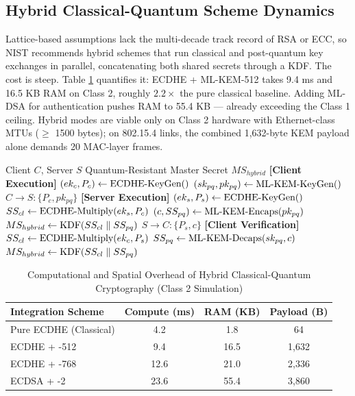 \subsection{Hybrid Classical-Quantum Scheme Dynamics}

Lattice-based assumptions lack the multi-decade track record of RSA or ECC, so NIST recommends hybrid schemes that run classical and post-quantum key exchanges in parallel, concatenating both shared secrets through a KDF. The cost is steep. Table \ref{tab:hybrid_overhead} quantifies it: ECDHE + ML-KEM-512 takes 9.4 ms and 16.5 KB RAM on Class 2, roughly $2.2\times$ the pure classical baseline. Adding ML-DSA for authentication pushes RAM to 55.4 KB — already exceeding the Class 1 ceiling. Hybrid modes are viable only on Class 2 hardware with Ethernet-class MTUs ($\geq$ 1500 bytes); on 802.15.4 links, the combined 1,632-byte KEM payload alone demands 20 MAC-layer frames.

\begin{algorithm}[htbp]
\caption{Standardized Hybrid ECDHE + ML-KEM Exchange}
\label{alg:hybrid}
\begin{algorithmic}[1]
\Require Client $C$, Server $S$
\Ensure Quantum-Resistant Master Secret $MS_{hybrid}$
\State \textbf{[Client Execution]}
\State $(ek_c, P_c) \gets \text{ECDHE-KeyGen}()$
\State $(sk_{pq}, pk_{pq}) \gets \text{ML-KEM-KeyGen}()$
\State $C \to S: \{P_c, pk_{pq}\}$
\State \textbf{[Server Execution]}
\State $(ek_s, P_s) \gets \text{ECDHE-KeyGen}()$
\State $SS_{cl} \gets \text{ECDHE-Multiply}(ek_s, P_c)$
\State $(c, SS_{pq}) \gets \text{ML-KEM-Encaps}(pk_{pq})$
\State $MS_{hybrid} \gets \text{KDF}(SS_{cl} \parallel SS_{pq})$
\State $S \to C: \{P_s, c\}$
\State \textbf{[Client Verification]}
\State $SS_{cl} \gets \text{ECDHE-Multiply}(ek_c, P_s)$
\State $SS_{pq} \gets \text{ML-KEM-Decaps}(sk_{pq}, c)$
\State $MS_{hybrid} \gets \text{KDF}(SS_{cl} \parallel SS_{pq})$
\end{algorithmic}
\end{algorithm}

\begin{table}[htbp]
\caption{Computational and Spatial Overhead of Hybrid Classical-Quantum Cryptography (Class 2 Simulation)}
\label{tab:hybrid_overhead}
\centering
\begin{tabular}{lccc}
\toprule
\textbf{Integration Scheme} & \textbf{Compute (ms)} & \textbf{RAM (KB)} & \textbf{Payload (B)} \\
\midrule
Pure ECDHE (Classical) & 4.2 & 1.8 & 64 \\
ECDHE + \kyber{}-512 & 9.4 & 16.5 & 1,632 \\
ECDHE + \kyber{}-768 & 12.6 & 21.0 & 2,336 \\
ECDSA + \dilithium{}-2 & 23.6 & 55.4 & 3,860 \\
\bottomrule
\end{tabular}
\end{table}

